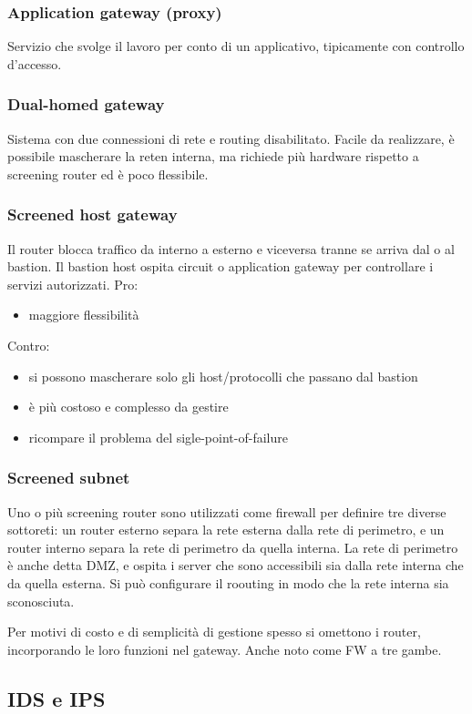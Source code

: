 \documentclass[11pt]{article}
\begin{document}
\subsubsection{Application gateway (proxy)}
Servizio che svolge il lavoro per conto di un applicativo, tipicamente con controllo d'accesso.
\subsubsection{Dual-homed gateway}
Sistema con due connessioni di rete e routing disabilitato. Facile da realizzare, è possibile mascherare la reten interna,
ma richiede più hardware rispetto a screening router ed è poco flessibile.
\subsubsection{Screened host gateway}
Il router blocca traffico da interno a esterno e viceversa tranne se arriva dal o al bastion. Il bastion host ospita circuit
o application gateway per controllare i servizi autorizzati.
Pro:
\begin{itemize}
    \item maggiore flessibilità
\end{itemize}
Contro:
\begin{itemize}
    \item si possono mascherare solo gli host/protocolli che passano dal bastion 
    \item è più costoso e complesso da gestire 
    \item ricompare il problema del sigle-point-of-failure
\end{itemize}
\subsubsection{Screened subnet}
Uno o più screening router sono utilizzati come firewall per definire tre diverse sottoreti: un router esterno separa la 
rete esterna dalla rete di perimetro, e un router interno separa la rete di perimetro da quella interna. La rete di perimetro 
è anche detta DMZ, e ospita i server che sono accessibili sia dalla rete interna che da quella esterna.
Si può configurare il roouting in modo che la rete interna sia sconosciuta.

Per motivi di costo e di semplicità di gestione spesso si omettono i router, incorporando le loro funzioni nel gateway.
Anche noto come FW a tre gambe.
\subsection{IDS e IPS}
\end{document}

